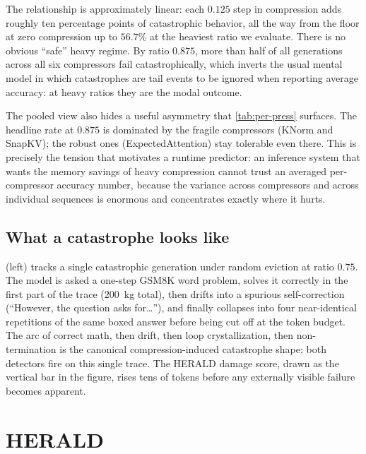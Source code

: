 \documentclass[11pt,a4paper]{article}
\begin{document}
The relationship is approximately linear: each $0.125$ step in compression adds roughly ten percentage points of catastrophic behavior, all the way from the floor at zero compression up to $56.7\%$ at the heaviest ratio we evaluate. There is no obvious ``safe'' heavy regime. By ratio $0.875$, more than half of all generations across all six compressors fail catastrophically, which inverts the usual mental model in which catastrophes are tail events to be ignored when reporting average accuracy: at heavy ratios they are the modal outcome.

The pooled view also hides a useful asymmetry that \cref{tab:per-press} surfaces. The headline rate at $0.875$ is dominated by the fragile compressors (KNorm and SnapKV); the robust ones (ExpectedAttention) stay tolerable even there. This is precisely the tension that motivates a runtime predictor: an inference system that wants the memory savings of heavy compression cannot trust an averaged per-compressor accuracy number, because the variance across compressors and across individual sequences is enormous and concentrates exactly where it hurts.

\subsection{What a catastrophe looks like}
\label{sec:failures:qualitative}

 (left) tracks a single catastrophic generation under random eviction at ratio $0.75$. The model is asked a one-step GSM8K word problem, solves it correctly in the first part of the trace ($200$~kg total), then drifts into a spurious self-correction (``However, the question asks for\ldots''), and finally collapses into four near-identical repetitions of the same boxed answer before being cut off at the token budget. The arc of correct math, then drift, then loop crystallization, then non-termination is the canonical compression-induced catastrophe shape; both detectors fire on this single trace. The HERALD damage score, drawn as the vertical bar in the figure, rises tens of tokens before any externally visible failure becomes apparent.

\section{HERALD}
\label{sec:herald}
\end{document}
